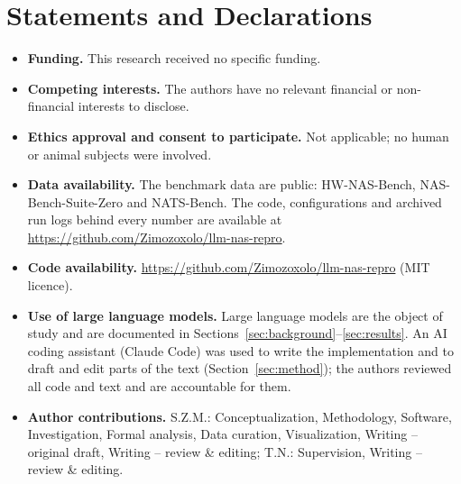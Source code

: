 \documentclass[pdflatex,sn-mathphys-ay]{sn-jnl}
\begin{document}
\backmatter

\section*{Statements and Declarations}
\begin{itemize}
\item \textbf{Funding.} This research received no specific funding.
\item \textbf{Competing interests.} The authors have no relevant financial or non-financial interests to disclose.
\item \textbf{Ethics approval and consent to participate.} Not applicable; no human or animal subjects were involved.
\item \textbf{Data availability.} The benchmark data are public: HW-NAS-Bench, NAS-Bench-Suite-Zero and NATS-Bench. The code, configurations and archived run logs behind every number are available at \url{https://github.com/Zimozoxolo/llm-nas-repro}.
\item \textbf{Code availability.} \url{https://github.com/Zimozoxolo/llm-nas-repro} (MIT licence).
\item \textbf{Use of large language models.} Large language models are the object of study and are documented in Sections~\ref{sec:background}--\ref{sec:results}. An AI coding assistant (Claude Code) was used to write the implementation and to draft and edit parts of the text (Section~\ref{sec:method}); the authors reviewed all code and text and are accountable for them.
\item \textbf{Author contributions.} S.Z.M.: Conceptualization, Methodology, Software, Investigation, Formal analysis, Data curation, Visualization, Writing -- original draft, Writing -- review \& editing; T.N.: Supervision, Writing -- review \& editing.
\end{itemize}
\end{document}
